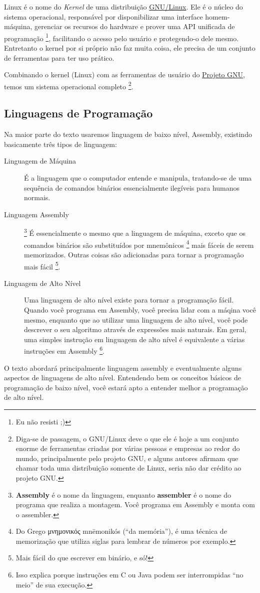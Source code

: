 Linux é o nome do \emph{Kernel} de uma distribuição \href{http://en.wikipedia.org/wiki/GNU/Linux_naming_controversy}{GNU/Linux}. Ele é o núcleo do sistema operacional, responsável por disponibilizar uma interface homem-máquina, gerenciar os recursos do hardware e prover uma API unificada de programação \footnote{Eu não resisti ;)}, facilitando o acesso pelo usuário e protegendo-o dele mesmo. Entretanto o kernel por si próprio não faz muita coisa, ele precisa de um conjunto de ferramentas para ter uso prático.

Combinando o kernel (Linux) com as ferramentas de usuário do \href{http://gnu.org}{Projeto GNU}, temos um sistema operacional completo \footnote{Diga-se de passagem, o GNU/Linux deve o que ele é hoje a um conjunto enorme de ferramentas criadas por várias pessoas e empresas ao redor do mundo, principalmente pelo projeto GNU, e alguns autores afirmam que chamar toda uma distribuição somente de Linux, seria não dar crédito ao projeto GNU.}.

\subsection{Linguagens de Programação}

Na maior parte do texto usaremos linguagem de baixo nível, Assembly, existindo basicamente três tipos de linguagem:

\begin{description}

\item[Linguagem de Máquina]
É a linguagem que o computador entende e manipula, tratando-se de uma sequência de comandos binários essencialmente ilegíveis para humanos normais.

\item[Linguagem Assembly]\footnote{\textbf{Assembly} é o nome da linguagem, enquanto \textbf{assembler} é o nome do programa que realiza a montagem. Você programa em Assembly e monta com o assembler.}
É essencialmente o mesmo que a linguagem de máquina, exceto que os comandos binários são substituídos por mnemônicos \footnote{Do Grego \textgreek{μνημονικός mnēmonikós} (``da memória''), é uma técnica de memorização que utiliza siglas para lembrar de números por exemplo.} mais fáceis de serem memorizados. Outras coisas são adicionadas para tornar a programação mais fácil \footnote{Mais fácil do que escrever em binário, e só!}.

\item[Linguagem de Alto Nível]
Uma linguagem de alto nível existe para tornar a programação fácil. Quando você programa em Assembly, você precisa lidar com a máqina você mesmo, enquanto que ao utilizar uma linguagem de alto nível, você pode descrever o seu algoritmo através de expressões mais naturais. Em geral, uma simples instrução em linguagem de alto nível é equivalente a várias instruções em Assembly \footnote{Isso explica porque instruções em C ou Java podem ser interrompidas ``no meio'' de sua execução.}.

\end{description}

O texto abordará principalmente linguagem assembly e eventualmente alguns aspectos de linguagens de alto nível. Entendendo bem os conceitos básicos de programação de baixo nível, você estará apto a entender melhor a programação de alto nível.



